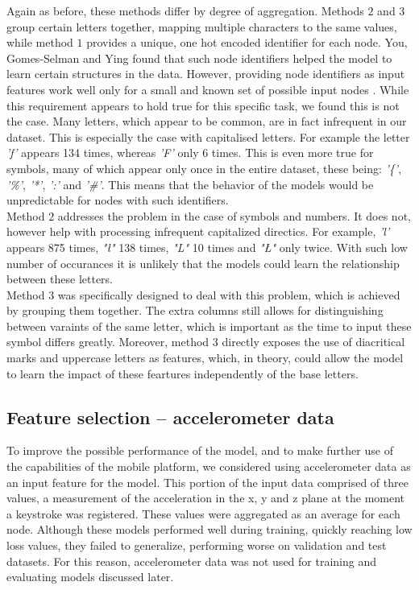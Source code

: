 Again as before, these methods differ by degree of aggregation. Methods $2$ and $3$ group certain letters together, mapping multiple characters to the same values, while method $1$ provides a unique, one hot encoded identifier for each node. You, Gomes-Selman and Ying \cite{you2021identityawaregraphneuralnetworks}
found that such node identifiers helped the model to learn certain structures in the data. However, providing node identifiers as input features work well only for a small and known set of possible input nodes \cite{Lesk2024}. While this requirement appears to hold true for this specific task, we found this is not the case. 
Many letters, which appear to be common, are in fact infrequent in our dataset. This is especially the case with capitalised letters. For example the letter \textit{'f'} appears 134 times, whereas \textit{'F'} only 6 times. This is even more true for symbols, many of which appear only once in the entire dataset, these being: \textit{'\{'}, \textit{'\%'}, \textit{'*'}, \textit{':'} and \textit{'\#'}.
This means that the behavior of the models would be unpredictable for nodes with such identifiers.\\
Method $2$ addresses the problem in the case of symbols and numbers. It does not, however help with processing infrequent capitalized directics. For example, \textit{'l'} appears 875 times, \textit{"ł"} 138 times, \textit{"L"} 10 times and \textit{"Ł"} only twice. With such low number of occurances it is unlikely that the models could learn the relationship between these letters. \\
Method $3$ was specifically designed to deal with this problem, which is achieved by grouping them together. The extra columns still allows for distinguishing between varaints of the same letter, which is important as the time to input these symbol differs greatly. 
Moreover, method $3$ directly exposes the use of diacritical marks and uppercase letters as features, which, in theory, could allow the model to learn the impact of these feartures independently of the base letters. 


\subsection{Feature selection -- accelerometer data} \label{accel_subsection}
To improve the possible performance of the model, and to make further use of the capabilities of the mobile platform, we considered using accelerometer data as an input feature for the model. 
This portion of the input data comprised of three values, a measurement of the acceleration in the x, y and z plane at the moment a keystroke was registered. 
These values were aggregated as an average for each node. Although these models performed well during training, quickly reaching low loss values, they failed to generalize, performing worse on validation and test datasets. For this reason, accelerometer data was not used for training and evaluating models discussed later.

